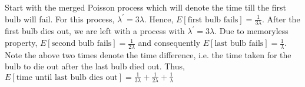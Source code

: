 \documentclass[../../probability-notes.tex]{subfiles}
\begin{document}
Start with the merged Poisson process which will denote the time till the first bulb will fail. For this process, $\lambda^{'} = 3\lambda$. Hence, $E[\text{first bulb fails}] = \frac{1}{3\lambda}$.
        After the first bulb dies out, we are left with a process with $\lambda^{'} = 3\lambda$. Due to memoryless property, $E[\text{second bulb fails}] = \frac{1}{2\lambda}$ and consequently $E[\text{last bulb fails}] = \frac{1}{\lambda}$. \newline
        Note the above two times denote the time difference, i.e. the time taken for the bulb to die out after the last bulb died out. Thus, $E[\text{time until last bulb dies out}] = \frac{1}{3\lambda} + \frac{1}{2\lambda} + \frac{1}{\lambda}$
\end{document}
